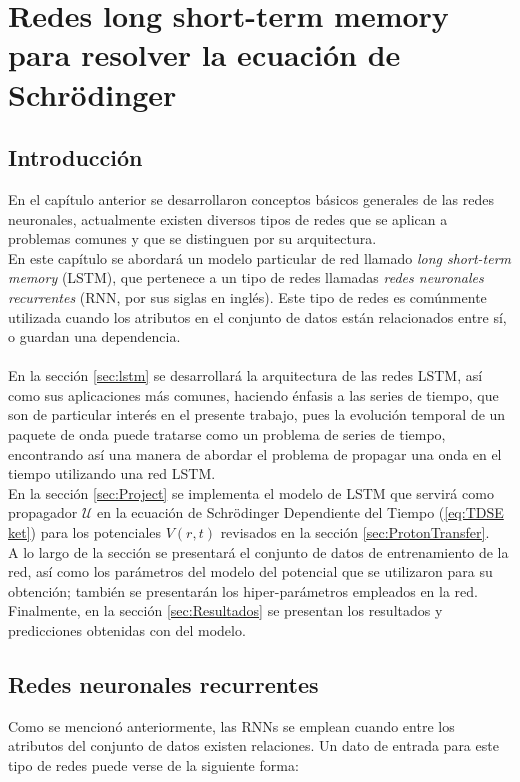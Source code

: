 \chapter{Redes long short-term memory para resolver la ecuación de Schrödinger}\label{ch:LSTMapplied}
\section{Introducción}
En el capítulo anterior se desarrollaron conceptos básicos generales de las redes neuronales, actualmente existen diversos tipos de redes que se aplican a problemas comunes y que se distinguen por su arquitectura.
\\
En este capítulo se abordará un modelo particular de red llamado \emph{long short-term memory} (\acs{LSTM}), que pertenece a un tipo de redes llamadas \emph{redes neuronales recurrentes} (\acs{RNN}, por sus siglas en inglés). Este tipo de redes es comúnmente utilizada cuando los atributos en el conjunto de datos están relacionados entre sí, o guardan una dependencia.
\\\\
En la sección \autoref{sec:lstm} se desarrollará la arquitectura de las redes \acs{LSTM}, así como sus aplicaciones más comunes, haciendo énfasis a las series de tiempo, que son de particular interés en el presente trabajo, pues la evolución temporal de un paquete de onda puede tratarse como un problema de series de tiempo, encontrando así una manera de abordar el problema de propagar una onda en el tiempo utilizando una red \acs{LSTM}.
\\
En la sección \autoref{sec:Project} se implementa el modelo de \acs{LSTM} que servirá como propagador $\mathcal{U}$ en la ecuación de Schrödinger Dependiente del Tiempo (\autoref{eq:TDSE ket}) para los potenciales $V(r,t)$ revisados en la sección \autoref{sec:ProtonTransfer}.
\\
A lo largo de la sección se presentará el conjunto de datos de entrenamiento de la red, así como los parámetros del modelo del potencial que se utilizaron para su obtención; también se presentarán los hiper-parámetros empleados en la red. Finalmente, en la sección \autoref{sec:Resultados} se presentan los resultados y predicciones obtenidas con del modelo.

\section{Redes neuronales recurrentes}\label{sec:RNN}
Como se mencionó anteriormente, las \acs{RNN}s se emplean cuando entre los atributos del conjunto de datos existen relaciones. Un dato de entrada para este tipo de redes puede verse de la siguiente forma:

